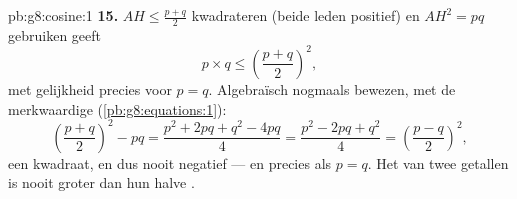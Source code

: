 \begin{solution}{pb:g8:cosine:1}
\textbf{15.} $AH \leq \frac{p+q}{2}$ kwadrateren (beide leden positief) en
$AH^2 = pq$ gebruiken geeft
\[
p \times q \leq \left(\frac{p+q}{2}\right)^2 ,
\]
met gelijkheid precies voor $p = q$. Algebraïsch nogmaals bewezen, met de
merkwaardige  (\cref{pb:g8:equations:1}):
\[
\left(\frac{p+q}{2}\right)^2 - pq
= \frac{p^2 + 2pq + q^2 - 4pq}{4}
= \frac{p^2 - 2pq + q^2}{4}
= \left(\frac{p-q}{2}\right)^2 ,
\]
een kwadraat, en dus nooit negatief --- en  precies als $p = q$. Het
 van twee getallen is nooit groter dan hun halve .
\end{solution}
